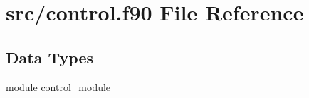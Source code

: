\hypertarget{control_8f90}{\section{src/control.f90 File Reference}
\label{control_8f90}
}
\subsection*{Data Types}
\begin{DoxyCompactItemize}
\item 
module \hyperlink{classcontrol__module}{control\-\_\-module}
\end{DoxyCompactItemize}
